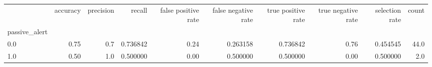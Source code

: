 \begin{tabular}{lrrrrrrrrr}
\toprule
{} &  accuracy &  precision &    recall &  false positive rate &  false negative rate &  true positive rate &  true negative rate &  selection rate &  count \\
passive\_alert &           &            &           &                      &                      &                     &                     &                 &        \\
\midrule
0.0           &      0.75 &        0.7 &  0.736842 &                 0.24 &             0.263158 &            0.736842 &                0.76 &        0.454545 &   44.0 \\
1.0           &      0.50 &        1.0 &  0.500000 &                 0.00 &             0.500000 &            0.500000 &                0.00 &        0.500000 &    2.0 \\
\bottomrule
\end{tabular}
